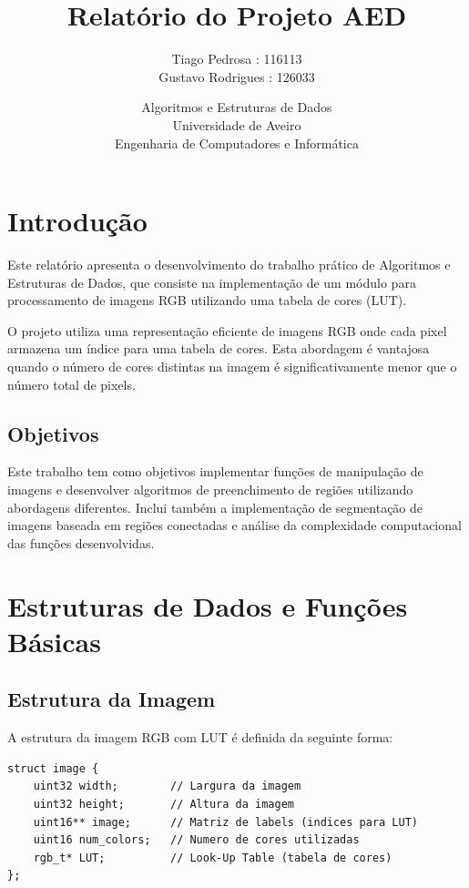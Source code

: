 \documentclass[12pt,a4paper]{article}
\title{Relatório do Projeto AED}
\author{Tiago Pedrosa : 116113 \\ Gustavo Rodrigues : 126033 }
\date{Algoritmos e Estruturas de Dados \\ Universidade de Aveiro \\ Engenharia de Computadores e Informática}
\begin{document}
\maketitle
\newpage

\tableofcontents
\newpage

\section{Introdução}

Este relatório apresenta o desenvolvimento do trabalho prático de Algoritmos e Estruturas de Dados, que consiste na implementação de um módulo para processamento de imagens RGB utilizando uma tabela de cores (LUT).

O projeto utiliza uma representação eficiente de imagens RGB onde cada pixel armazena um índice para uma tabela de cores. Esta abordagem é vantajosa quando o número de cores distintas na imagem é significativamente menor que o número total de pixels.

\subsection{Objetivos}

Este trabalho tem como objetivos implementar funções de manipulação de imagens e desenvolver algoritmos de preenchimento de regiões utilizando abordagens diferentes. Inclui também a implementação de segmentação de imagens baseada em regiões conectadas e análise da complexidade computacional das funções desenvolvidas.

\section{Estruturas de Dados e Funções Básicas}

\subsection{Estrutura da Imagem}

A estrutura da imagem RGB com LUT é definida da seguinte forma:

\begin{lstlisting}
struct image {
    uint32 width;        // Largura da imagem
    uint32 height;       // Altura da imagem
    uint16** image;      // Matriz de labels (indices para LUT)
    uint16 num_colors;   // Numero de cores utilizadas
    rgb_t* LUT;          // Look-Up Table (tabela de cores)
};
\end{lstlisting}
\end{document}
